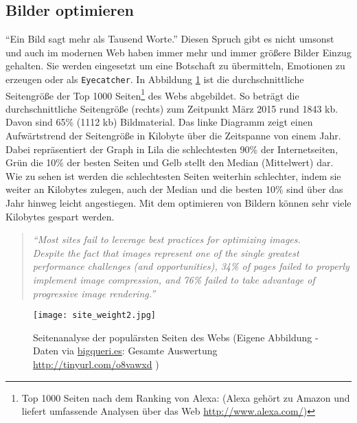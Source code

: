 %
%	

	\subsection{Bilder optimieren} %
	\label{sub:bilder_optimieren}
		"`Ein Bild sagt mehr als Tausend Worte."' Diesen Spruch gibt es nicht umsonst und auch im modernen Web haben immer mehr und immer größere Bilder Einzug gehalten. Sie werden eingesetzt um eine Botschaft zu übermitteln, Emotionen zu erzeugen oder als \texttt{Eyecatcher}. In Abbildung \ref{fig:site_weight} ist die durchschnittliche Seitengröße der Top 1000 Seiten\footnote{Top 1000 Seiten nach dem Ranking von Alexa: (Alexa gehört zu Amazon und liefert umfassende Analysen über das Web \url{http://www.alexa.com/}) } des Webs abgebildet. So beträgt die durchschnittliche Seitengröße (rechts) zum Zeitpunkt März 2015 rund 1843 kb. Davon sind 65\% (1112 kb) Bildmaterial. Das linke Diagramm zeigt einen Aufwärtstrend der Seitengröße in Kilobyte über die Zeitspanne von einem Jahr. Dabei repräsentiert der Graph in Lila die schlechtesten 90\% der Internetseiten, Grün die 10\% der besten Seiten und Gelb stellt den Median (Mittelwert) dar. Wie zu sehen ist werden die schlechtesten Seiten weiterhin schlechter, indem sie weiter an Kilobytes zulegen, auch der Median und die besten 10\% sind über das Jahr hinweg leicht angestiegen. Mit dem optimieren von Bildern können sehr viele Kilobytes gespart werden.

		\begin{quote}
			\textit{"`Most sites fail to leverage best practices for optimizing images.\\
			Despite the fact that images represent one of the single greatest performance challenges (and opportunities), 34\% of pages failed to properly implement image compression, and 76\% failed to take advantage of progressive image rendering."'} \autocite[p. 4]{radware14}
		\end{quote}

		\begin{figure}[htbp]
			\begin{center}
				\texttt{[image: site\_weight2.jpg]}
				\caption{Seitenanalyse der populärsten Seiten des Webs (Eigene Abbildung - Daten via \url{bigqueri.es}: Gesamte Auswertung \url{http://tinyurl.com/o8vawxd} )}
				\label{fig:site_weight}
			\end{center}
		\end{figure}

